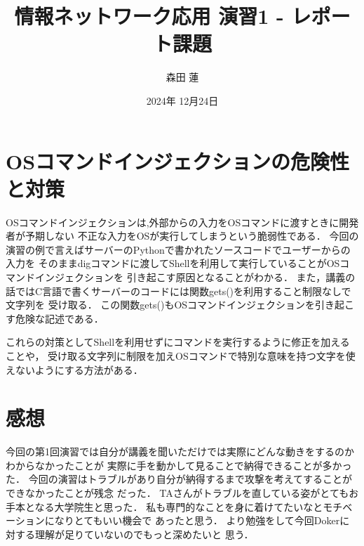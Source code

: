\documentclass{jlreq}
\title{情報ネットワーク応用 演習1 - レポート課題}
\author{森田 蓮}
\date{2024年 12月24日}
\begin{document}
\maketitle

\section{OSコマンドインジェクションの危険性と対策}
OSコマンドインジェクションは,外部からの入力をOSコマンドに渡すときに開発者が予期しない
不正な入力をOSが実行してしまうという脆弱性である．
今回の演習の例で言えばサーバーのPythonで書かれたソースコードでユーザーからの入力を
そのままdigコマンドに渡してShellを利用して実行していることがOSコマンドインジェクションを
引き起こす原因となることがわかる．
また，講義の話ではC言語で書くサーバーのコードには関数gets()を利用すること制限なしで文字列を
受け取る．
この関数gets()もOSコマンドインジェクションを引き起こす危険な記述である．

これらの対策としてShellを利用せずにコマンドを実行するように修正を加えることや，
受け取る文字列に制限を加えOSコマンドで特別な意味を持つ文字を使えないようにする方法がある．




\section{感想}
今回の第1回演習では自分が講義を聞いただけでは実際にどんな動きをするのかわからなかったことが
実際に手を動かして見ることで納得できることが多かった．
今回の演習はトラブルがあり自分が納得するまで攻撃を考えてすることができなかったことが残念
だった．
TAさんがトラブルを直している姿がとてもお手本となる大学院生と思った．
私も専門的なことを身に着けてたいなとモチベーションになりとてもいい機会で
あったと思う．
より勉強をして今回Dokerに対する理解が足りていないのでもっと深めたいと
思う．
\end{document}
